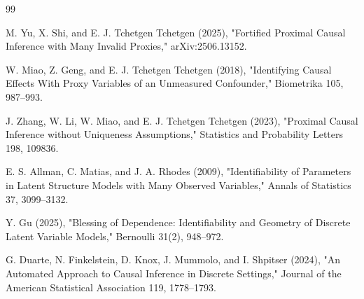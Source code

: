 \documentclass{article}
\begin{document}
\begin{thebibliography}{99}

   M. Yu, X. Shi, and E. J. Tchetgen Tchetgen (2025), "Fortified Proximal Causal Inference with Many Invalid Proxies," arXiv:2506.13152.

   W. Miao, Z. Geng, and E. J. Tchetgen Tchetgen (2018), "Identifying Causal Effects With Proxy Variables of an Unmeasured Confounder," Biometrika 105, 987--993.

   J. Zhang, W. Li, W. Miao, and E. J. Tchetgen Tchetgen (2023), "Proximal Causal Inference without Uniqueness Assumptions," Statistics and Probability Letters 198, 109836.

   E. S. Allman, C. Matias, and J. A. Rhodes (2009), "Identifiability of Parameters in Latent Structure Models with Many Observed Variables," Annals of Statistics 37, 3099--3132.

   Y. Gu (2025), "Blessing of Dependence: Identifiability and Geometry of Discrete Latent Variable Models," Bernoulli 31(2), 948--972.

   G. Duarte, N. Finkelstein, D. Knox, J. Mummolo, and I. Shpitser (2024), "An Automated Approach to Causal Inference in Discrete Settings," Journal of the American Statistical Association 119, 1778--1793.

\end{thebibliography}
\end{document}
